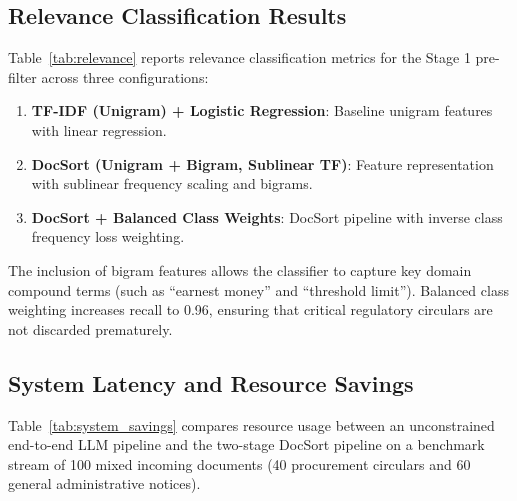 \documentclass{article}
\begin{document}
\subsection{Relevance Classification Results}
Table~\ref{tab:relevance} reports relevance classification metrics for the Stage 1 pre-filter across three configurations:
\begin{enumerate}
    \item \textbf{TF-IDF (Unigram) + Logistic Regression}: Baseline unigram features with linear regression.
    \item \textbf{DocSort (Unigram + Bigram, Sublinear TF)}: Feature representation with sublinear frequency scaling and bigrams.
    \item \textbf{DocSort + Balanced Class Weights}: DocSort pipeline with inverse class frequency loss weighting.
\end{enumerate}

\begin{table}[t]
\centering
{}
\caption{Relevance classification performance on the test split.}
\label{tab:relevance}
\end{table}

The inclusion of bigram features allows the classifier to capture key domain compound terms (such as ``earnest money'' and ``threshold limit''). Balanced class weighting increases recall to 0.96, ensuring that critical regulatory circulars are not discarded prematurely.

\subsection{System Latency and Resource Savings}
Table~\ref{tab:system_savings} compares resource usage between an unconstrained end-to-end LLM pipeline and the two-stage DocSort pipeline on a benchmark stream of 100 mixed incoming documents (40 procurement circulars and 60 general administrative notices).
\end{document}
